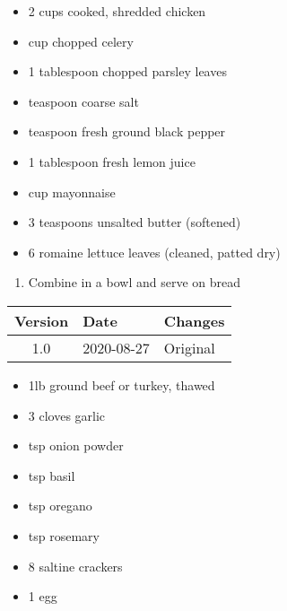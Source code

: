 \ingredients
\begin{multicols}{2}
\raggedcolumns %
\begin{itemize}
    \item 2 cups cooked, shredded chicken 
    \item {} cup chopped celery
    \item 1 tablespoon chopped parsley leaves
    \item {} teaspoon coarse salt
    \item {} teaspoon fresh ground black pepper
    \item 1 tablespoon fresh lemon juice
    \item {} cup mayonnaise
    \item 3 teaspoons unsalted butter (softened)
    \item 6 romaine lettuce leaves (cleaned, patted dry)
\end{itemize}
\end{multicols}

\instructions
\begin{enumerate}
    \item Combine in a bowl and serve on bread
\end{enumerate}

\vfill

\begin{tabular}{ c | l | l }
  \textbf{Version} & \textbf{Date} & \textbf{Changes} \\ 
  \hline		
  1.0 & 2020-08-27 & Original \\
\end{tabular}




\ingredients
\begin{multicols}{2}
\raggedcolumns %
\begin{itemize}
    \item 1lb ground beef or turkey, thawed
    \item 3 cloves garlic
    \item {} tsp onion powder
    \item {} tsp basil
    \item {} tsp oregano
    \item {} tsp rosemary
    \item 8 saltine crackers
    \item 1 egg
\end{itemize}
\end{multicols}

